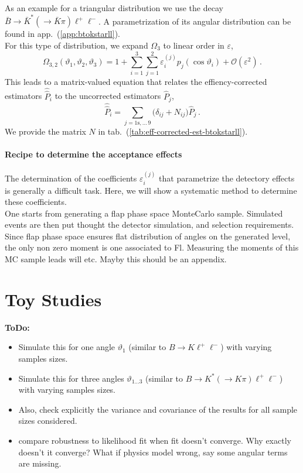 \documentclass[aps,prd,reprint,nofootinbib,preprintnumbers]{revtex4}
\newcommand{\refapp}[1]{app.~(\ref{app:#1})}
\newcommand{\reftab}[1]{tab.~(\ref{tab:#1})}
\renewcommand{\theta}{\vartheta}
\newcommand{\order}[1]{\mathcal{O}\left({#1}\right)}
\let\eps\varepsilon
\newcommand{\what}[1]{\widehat{#1}}
\newcommand{\wwhat}[1]{\widehat{\widehat{#1}}}
\newcommand{\todo}[1]{{\color{red}\bf ToDo: #1}}
\begin{document}
As an example for a triangular distribution we use the decay $\bar{B}\to\bar{K}^*(\to \bar{K}\pi)\ell^+\ell^-$.
A parametrization of its angular distribution can be found in \refapp{btokstarll}.\\

For this type of distribution, we expand $\Omega_3$ to linear order in $\eps$,
\begin{equation}
    \Omega_{3,2}(\theta_1,\theta_2,\theta_3) = 1 + \sum_{i=1}^3 \sum_{j=1}^2 \eps_i^{(j)} p_j(\cos\theta_i) + \order{\eps^2}\,.
\end{equation}
This leads to a matrix-valued equation that relates the effiency-corrected estimators $\wwhat{P}_i$ to the uncorrected
estimators $\what{P}_j$,
\begin{equation}
    \label{eq:eff-corrected-est-btokstarll}
    \wwhat{P}_i = \sum_{j=1\text{s},\dots\,9} \big(\delta_{ij} + N_{ij}\big) \what{P}_j\,.
\end{equation}
We provide the matrix $N$ in \reftab{eff-corrected-est-btokstarll}.\\

\paragraph{Recipe to determine the acceptance effects}

The determination of the coefficients $\eps_i^{(j)}$ that parametrize the detectory effects is generally
a difficult task. Here, we will show a systematic method to determine these coefficients.\\
One starts from generating a flap phase space MonteCarlo sample. Simulated events are then put thought the detector simulation, and selection requirements. Since flap phase space ensures flat distribution of angles on the generated level, the only non zero moment is one associated to Fl. Measuring the moments of this MC sample leads will etc. Mayby this should be an appendix.





\section{Toy Studies}
\label{sec:numerics}







\todo{
\begin{itemize}
    \item Simulate this for one angle $\theta_{1}$ (similar to $B\to K \ell^+\ell^-$) with varying samples sizes.
    \item Simulate this for three angles $\theta_{1\dots 3}$ (similar to $B\to K^*(\to K \pi)\ell^+\ell^-$) with varying samples sizes.
    \item Also, check explicitly the variance and covariance of the results for all sample sizes considered.
    \item compare robustness to likelihood fit when fit doesn't
      converge. Why exactly doesn't it converge? What if physics model
      wrong, say some angular terms are missing.
\end{itemize}}
\end{document}
